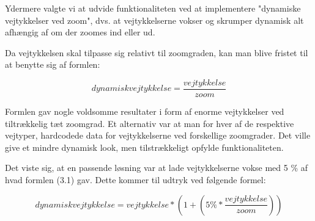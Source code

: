 Ydermere valgte vi at udvide funktionaliteten ved at implementere "dynamiske vejtykkelser ved zoom", dvs. at vejtykkelserne vokser  og skrumper dynamisk alt afhængig af om der zoomes ind eller ud. 

Da vejtykkelsen skal tilpasse sig relativt til zoomgraden, kan man blive fristet til at benytte sig af formlen:

\begin{equation}
	dynamisk vejtykkelse = \frac{vejtykkelse}{zoom}
\end{equation}

Formlen gav nogle voldsomme resultater i form af enorme vejtykkelser ved tiltrækkelig tæt zoomgrad. 
Et alternativ var at man for hver af de respektive vejtyper, hardcodede data for vejtykkelserne ved forskellige zoomgrader. Det ville give et mindre dynamisk look, men tilstrækkeligt opfylde funktionaliteten. 

Det viste sig, at en passende løsning var at lade vejtykkelserne vokse med 5 \% af hvad formlen (3.1)  gav. Dette kommer til udtryk ved følgende formel:  

\begin{equation}
	dynamisk vejtykkelse = vejtykkelse * (1+ ( 5\% * \frac{vejtykkelse}{zoom}))
\end{equation}

